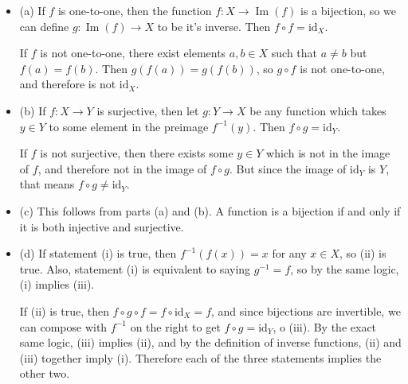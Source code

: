\documentclass[12pt]{article}
\begin{document}
\begin{itemize}
    \item (a) If $f$ is one-to-one, then the function $f: X \rightarrow \operatorname{Im}(f)$ is a bijection, so we can define $g: \operatorname{Im}(f) \rightarrow X$ to be it's inverse. Then $f \circ f = \mathrm{id}_X$.
        \par
        If $f$ is not one-to-one, there exist elements $a,b \in X$ such that $a \neq b$ but $f(a)=f(b)$. Then $g(f(a))=g(f(b))$, so $g \circ f$ is not one-to-one, and therefore is not $\mathrm{id}_X$.
    \item (b) If $f: X \rightarrow Y$ is surjective, then let $g: Y \rightarrow X$ be any function which takes $y \in Y$ to some element in the preimage $f^{-1}(y)$. Then $f \circ g = \mathrm{id}_Y$.
        \par
        If $f$ is not surjective, then there exists some $y \in Y$ which is not in the image of $f$, and therefore not in the image of $f \circ g$. But since the image of $\mathrm{id}_Y$ is $Y$, that means $f \circ g \neq \mathrm{id}_Y$.
    \item (c) This follows from parts (a) and (b). A function is a bijection if and only if it is both injective and surjective.
    \item (d) If statement (i) is true, then $f^{-1}(f(x))=x$ for any $x \in X$, so (ii) is true. Also, statement (i) is equivalent to saying $g^{-1}=f$, so by the same logic, (i) implies (iii).
        \par
        If (ii) is true, then $f \circ g \circ f = f \circ \mathrm{id}_X = f$, and since bijections are invertible, we can compose with $f^{-1}$ on the right to get $f \circ g = \mathrm{id}_Y$, o (iii). By the exact same logic, (iii) implies (ii), and by the definition of inverse functions, (ii) and (iii) together imply (i). Therefore each of the three statements implies the other two.
\end{itemize}
\end{document}
